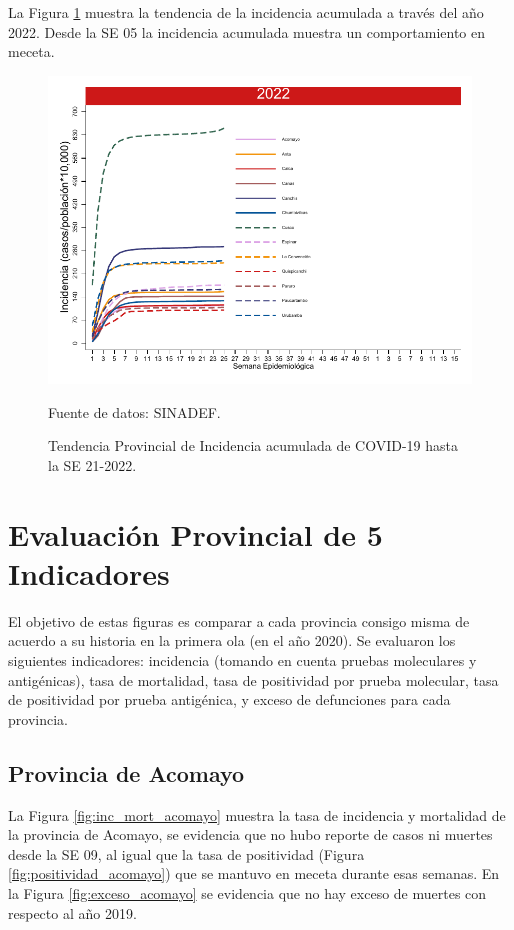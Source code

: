 \documentclass[12pt,a4paper,openany]{book}
\begin{document}
	La Figura \ref{fig:incidencia_provincial} muestra la tendencia de la incidencia acumulada a través del año 2022. Desde la SE 05 la incidencia acumulada muestra un comportamiento en meceta. 
	
	\begin{figure}[h]
		\caption{Tendencia Provincial de Incidencia acumulada de COVID-19 hasta la SE 21-2022. }\label{fig:incidencia_provincial}
		\begin{center}
			\includegraphics[width=0.60\linewidth]{../figuras/incidencia_provincial_acumulada_2022.pdf}
		\end{center}
		{\footnotesize {Fuente de datos: SINADEF.}}
	\end{figure}
	
	\clearpage
	
	\section*{Evaluación Provincial de 5 Indicadores}
	\noindent El objetivo de estas figuras es comparar a cada provincia consigo misma de acuerdo a su historia  en la primera ola (en el año 2020). Se evaluaron los siguientes indicadores: incidencia (tomando en cuenta pruebas moleculares y antigénicas), tasa de mortalidad, tasa de positividad por prueba molecular, tasa de positividad por prueba antigénica, y exceso de defunciones para cada provincia.
	
	\subsection*{Provincia de Acomayo}
	\noindent La Figura \ref{fig:inc_mort_acomayo} muestra la tasa de incidencia y mortalidad de la provincia de Acomayo, se evidencia que no hubo reporte de casos ni muertes desde la SE 09, al igual que la tasa de positividad (Figura \ref{fig:positividad_acomayo}) que se mantuvo en meceta durante esas semanas.  
	En la Figura \ref{fig:exceso_acomayo} se evidencia que no hay exceso de muertes con respecto al año 2019.
	
\end{document}
